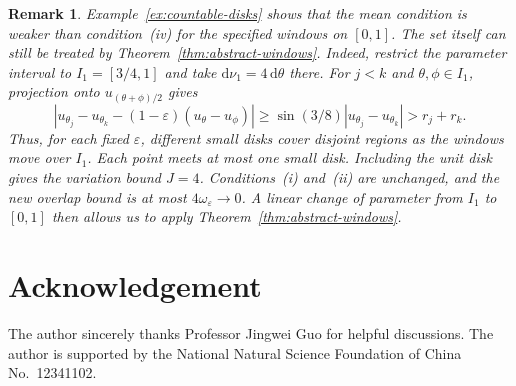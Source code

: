 \documentclass[12pt,reqno,tbtags]{amsart}
\newtheorem{remark}{Remark}[section]
\def\d{\mathrm{d}}
\newcommand\1{\mathbbm{1}}
\newcommand{\eps}{\varepsilon}
\def\d{\mathrm{d}}
\begin{document}
\begin{remark}\label{rem:countable-original-criterion}
Example~\ref{ex:countable-disks} shows that the mean condition is weaker than
condition~(iv) for the specified windows on $[0,1]$.
The set itself can still be treated by Theorem~\ref{thm:abstract-windows}.
Indeed, restrict the parameter interval to $I_1=[3/4,1]$ and take
$\d\nu_1=4\,\d\theta$ there. For $j<k$ and $\theta,\phi\in I_1$,
projection onto $u_{(\theta+\phi)/2}$ gives
\begin{equation*}
    |u_{\theta_j}-u_{\theta_k}-(1-\eps)(u_\theta-u_\phi)|
    \ge\sin(3/8)|u_{\theta_j}-u_{\theta_k}|>r_j+r_k.
\end{equation*}
Thus, for each fixed $\eps$, different small disks cover disjoint regions
as the windows move over $I_1$. Each point meets at most one small disk.
Including the unit disk gives the variation bound $J=4$.
Conditions~(i) and~(ii) are unchanged, and the new overlap bound is at most
$4\omega_\eps\to0$. A linear change of parameter from $I_1$ to $[0,1]$
then allows us to apply Theorem~\ref{thm:abstract-windows}.
\end{remark}

\section*{Acknowledgement}
The author sincerely thanks Professor Jingwei Guo for helpful discussions.
The author is supported by the National
Natural Science Foundation of China No.~12341102.
\end{document}
